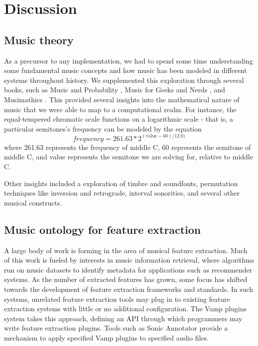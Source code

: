 \documentclass[11pt,conference,letterpaper]{IEEEtran}
\begin{document}
\section{Discussion}

\subsection {Music theory}
As a precursor to any implementation, we had to spend some time understanding some fundamental music concepts and how music has been modeled in different systems throughout history. We supplemented this exploration through several books, such as Music and Probability \cite{temperly2007mprob}, Music for Geeks and Nerds \cite{krogerGeeksNerds}, and Musimathics \cite{loy2006musimathics}. This provided several insights into the mathematical nature of music that we were able to map to a computational realm. For instance, the equal-tempered chromatic scale functions on a logarithmic scale - that is, a particular semitones's frequency can be modeled by the equation
{\small
	\[frequency = 261.63 * 2^{(\text{value} - 60) / 12.0)}\]
}
where 261.63 represents the frequency of middle C, 60 represents the semitone of middle C, and value represents the semitone we are solving for, relative to middle C.

Other insights included a exploration of timbre and soundfonts, permutation techniques like inversion and retrograde, interval sonorities, and several other musical constructs.

\subsection{Music ontology for feature extraction}

A large body of work is forming in the area of musical feature extraction. Much of this work is fueled by interests in music information retrieval, where algorithms run on music datasets to identify metadata for applications such as recommender systems. As the number of extracted features has grown, some focus has shifted towards the development of feature extraction frameworks and standards. In such systems, unrelated feature extraction tools may plug in to existing feature extraction systems with little or no additional configuration. The Vamp plugins system takes this approach, defining an API through which programmers may write feature extraction plugins. Tools such as Sonic Annotator provide a mechanism to apply specified Vamp plugins to specified audio files.
\end{document}
